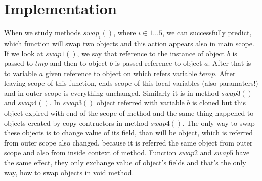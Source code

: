 \documentclass[5pt]{article}
\begin{document}
\section{Implementation}
When we study methods $swap_{i}()$, where $i \in {1\ldots5}$, we can
successfully predict, which function will swap two objects and this action
appears also in main scope. If we look at $swap1()$, we say that reference to
the instance of object $b$ is passed to $tmp$ and then to object $b$ is passed
reference to object $a$. After that is to variable $a$ given reference to object
on which refers variable $temp$. After leaving scope of this function, ends
scope of this local variables (also paramaters!) and in outer scope is
everything unchanged. Similarly it is in method $swap3()$ and $swap4()$. In
$swap3()$ object referred with variable $b$ is cloned but this object expired
with end of the scope of method and the same thing happened to objects
created by copy contructors in method $swap4()$. The only way to swap these
objects is to change value of its field, than will be object, which is referred
from outer scope also changed, because it is referred the same object from outer
scope and also from inside context of method. Function $swap2$ and $swap5$ have
the same effect, they only exchange value of object's fields and that's the
only way, how to swap objects in void method.\newpage

\newpage

\end{document}
